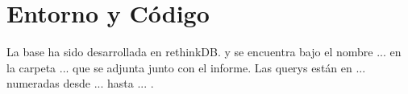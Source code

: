 \section{Entorno y Código}

La base ha sido desarrollada en rethinkDB. y se encuentra bajo el nombre ... en la carpeta ... que se adjunta junto con el informe. Las querys están en ... numeradas desde ... hasta ... . 